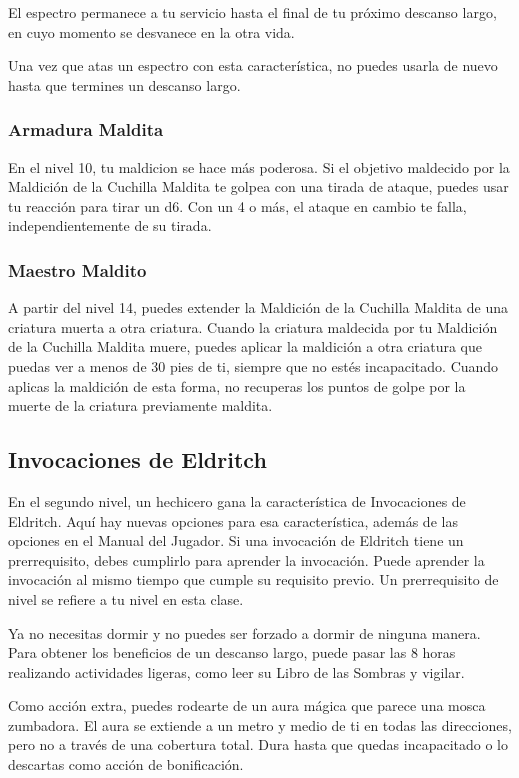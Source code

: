 \documentclass[a4paper,twocolumn,openany,10pt]{dndbook}
\begin{document}
El espectro permanece a tu servicio hasta el final de tu próximo descanso largo, en cuyo momento se desvanece en la otra vida.

Una vez que atas un espectro con esta característica, no puedes usarla de nuevo hasta que termines un descanso largo. 

\subsubsection{Armadura Maldita}
En el nivel 10, tu maldicion se hace más poderosa. Si el objetivo maldecido por la Maldición de la Cuchilla Maldita te golpea
con una tirada de ataque, puedes usar tu reacción para tirar un d6. Con un 4 o más, el ataque en cambio te falla,
independientemente de su tirada.

\subsubsection{Maestro Maldito}
A partir del nivel 14, puedes extender la Maldición de la Cuchilla Maldita de una criatura muerta a otra criatura. Cuando la
criatura maldecida por tu Maldición de la Cuchilla Maldita muere, puedes aplicar la maldición a otra criatura que puedas ver a
menos de 30 pies de ti, siempre que no estés incapacitado. Cuando aplicas la maldición de esta forma, no recuperas los puntos de
golpe por la muerte de la criatura previamente maldita. 

\subsection{Invocaciones de Eldritch}
En el segundo nivel, un hechicero gana la característica de Invocaciones de Eldritch. Aquí hay nuevas opciones para esa
característica, además de las opciones en el Manual del Jugador. Si una invocación de Eldritch tiene un prerrequisito, debes
cumplirlo para aprender la invocación. Puede aprender la invocación al mismo tiempo que cumple su requisito previo. Un
prerrequisito de nivel se refiere a tu nivel en esta clase.

Ya no necesitas dormir y no puedes ser forzado a dormir de ninguna manera. Para obtener los beneficios de un descanso largo,
puede pasar las 8 horas realizando actividades ligeras, como leer su Libro de las Sombras y vigilar. 

Como acción extra, puedes rodearte de un aura mágica que parece una mosca zumbadora. El aura se extiende a un metro y medio de
ti en todas las direcciones, pero no a través de una cobertura total. Dura hasta que quedas incapacitado o lo descartas como
acción de bonificación.
\end{document}
